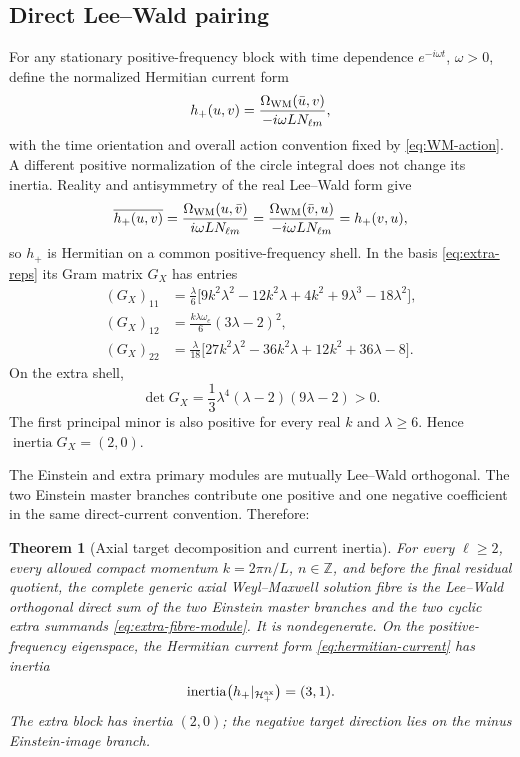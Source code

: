 \documentclass[11pt]{article}
\newtheorem{theorem}{Theorem}[section]
\theoremstyle{remark}
\begin{document}
\subsection{Direct Lee--Wald pairing}
For any stationary positive-frequency block with time dependence
$e^{-i\omega t}$, $\omega>0$, define the normalized Hermitian current form
\begin{equation}\label{eq:hermitian-current}
 h_+(u,v)=\frac{\Omega_{\rm WM}(\bar u,v)}
 {-i\omega L N_{\ell m}},
\end{equation}
with the time orientation and overall action convention fixed by
\eqref{eq:WM-action}. A different positive normalization of the circle
integral does not change its inertia. Reality and antisymmetry of the real
Lee--Wald form give
\begin{equation}
 \overline{h_+(u,v)}
 =\frac{\Omega_{\rm WM}(u,\bar v)}{i\omega L N_{\ell m}}
 =\frac{\Omega_{\rm WM}(\bar v,u)}{-i\omega L N_{\ell m}}
 =h_+(v,u),
\end{equation}
so $h_+$ is Hermitian on a common positive-frequency shell. In the basis
\eqref{eq:extra-reps} its Gram matrix $G_X$ has entries
\begin{align}
 (G_X)_{11}
 &=\frac{\lambda}{6}\bigl[
 9k^2\lambda^2-12k^2\lambda+4k^2
 +9\lambda^3-18\lambda^2\bigr],\label{eq:gx11}\\
 (G_X)_{12}
 &=\frac{k\lambda\omega_e}{6}(3\lambda-2)^2,\label{eq:gx12}\\
 (G_X)_{22}
 &=\frac{\lambda}{18}\bigl[
 27k^2\lambda^2-36k^2\lambda+12k^2
 +36\lambda-8\bigr].\label{eq:gx22}
\end{align}
On the extra shell,
\begin{equation}\label{eq:extra-det}
 \det G_X=\frac13\lambda^4(\lambda-2)(9\lambda-2)>0.
\end{equation}
The first principal minor is also positive for every real $k$ and
$\lambda\geq6$. Hence $\operatorname{inertia}G_X=(2,0)$.

The Einstein and extra primary modules are mutually Lee--Wald orthogonal.
The two Einstein master branches contribute one positive and one negative
coefficient in the same direct-current convention. Therefore:

\begin{theorem}[Axial target decomposition and current inertia]
\label{thm:axial-target}
For every $\ell\geq2$, every allowed compact momentum
$k=2\pi n/L$, $n\in\mathbb Z$, and before the final
residual quotient, the complete generic axial Weyl--Maxwell solution fibre
is the Lee--Wald orthogonal direct sum of the two Einstein master branches and
the two cyclic extra summands \eqref{eq:extra-fibre-module}. It is
nondegenerate. On the positive-frequency eigenspace, the Hermitian current
form \eqref{eq:hermitian-current} has inertia
\begin{equation}
 \operatorname{inertia}\bigl(h_+|_{\mathcal H^{\rm ax}_+}\bigr)=(3,1).
\end{equation}
The extra block has inertia $(2,0)$; the negative target direction lies on
the minus Einstein-image branch.
\end{theorem}
\end{document}
